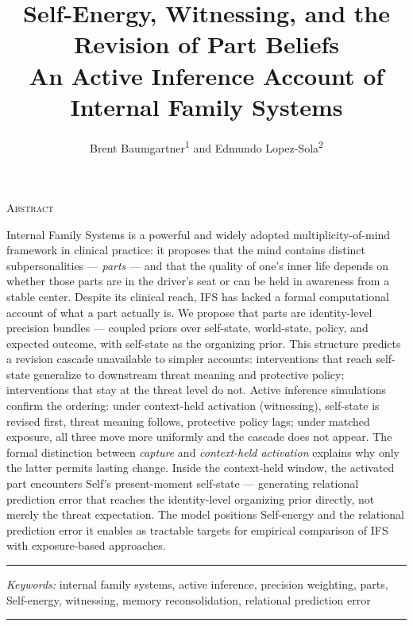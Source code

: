 \documentclass[12pt,a4paper]{article}
\title{Self-Energy, Witnessing, and the Revision of Part Beliefs\\[0.5em]%
  \large An Active Inference Account of Internal Family Systems}
\author{Brent Baumgartner\textsuperscript{1} and Edmundo Lopez-Sola\textsuperscript{2}}
\affiliation{%
  \textsuperscript{1}Independent Researcher \quad
  \textsuperscript{2}Active Inference Institute
}
\date{}
\makeatletter
\newcommand{\@affiliation}{}
\renewcommand{\maketitle}{%
  \thispagestyle{empty}%
  \begin{center}
    \vspace*{1.5em}
    {\Large \@title\par}
    \vspace{2.2em}
    {\normalsize \@author\par}
    \vspace{0.6em}
    {\small \@affiliation\par}
    \vspace{3.5em}
  \end{center}
}
\makeatother
\begin{document}
\maketitle


\begin{center}
  \textsc{Abstract}
\end{center}
\vspace{0.4em}

Internal Family Systems is a powerful and widely adopted
multiplicity-of-mind framework in clinical practice: it proposes that
the mind contains distinct subpersonalities --- \emph{parts} --- and
that the quality of one's inner life depends on whether those parts are
in the driver's seat or can be held in awareness from a stable center.
Despite its clinical reach, IFS has lacked a formal computational
account of what a part actually is. We propose that parts are
identity-level precision bundles --- coupled priors over self-state,
world-state, policy, and expected outcome, with self-state as the
organizing prior. This structure predicts a revision cascade unavailable
to simpler accounts: interventions that reach self-state generalize to
downstream threat meaning and protective policy; interventions that stay
at the threat level do not. Active inference simulations confirm the
ordering: under context-held activation (witnessing), self-state is
revised first, threat meaning follows, protective policy lags; under
matched exposure, all three move more uniformly and the cascade does not
appear. The formal distinction between \emph{capture} and
\emph{context-held activation} explains why only the latter permits
lasting change. Inside the context-held window, the activated part
encounters Self's present-moment self-state --- generating relational
prediction error that reaches the identity-level organizing prior
directly, not merely the threat expectation. The model positions
Self-energy and the relational prediction error it enables as tractable
targets for empirical comparison of IFS with exposure-based approaches.

\begin{center}\rule{0.5\linewidth}{0.5pt}\end{center}

\vspace{1.5em}
\noindent\textit{Keywords:} internal family systems, active inference, precision weighting, parts, Self-energy, witnessing, memory reconsolidation, relational prediction error

\vspace{0.8em}
\noindent\rule{\linewidth}{0.4pt}
\vspace{0.5em}
\end{document}
